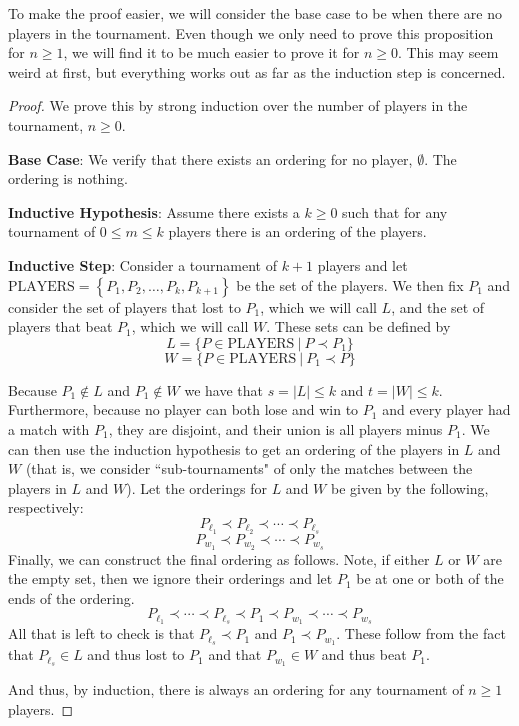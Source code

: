 \documentclass{article}
\theoremstyle{plain}
\theoremstyle{definition}
\begin{document}
To make the proof easier, we will consider the base case to be when there are no players in the tournament. Even though we only need to prove this proposition for \(n \geq 1\), we will find it to be much easier to prove it for \(n \geq 0\). This may seem weird at first, but everything works out as far as the induction step is concerned.

\begin{proof}
    We prove this by strong induction over the number of players in the tournament, \(n \geq 0\).
    
    \textbf{Base Case}: We verify that there exists an ordering for no player, \(\emptyset\). The ordering is nothing.

    \textbf{Inductive Hypothesis}: Assume there exists a \(k \geq 0\) such that for any tournament of \(0 \leq m \leq k\) players there is an ordering of the players.

    \textbf{Inductive Step}: Consider a tournament of \(k+1\) players and let \(\text{PLAYERS} = \left\{P_1, P_2, \dotsc, P_k, P_{k+1}\right\}\) be the set of the players. We then fix \(P_1\) and consider the set of players that lost to \(P_1\), which we will call \(L\), and the set of players that beat \(P_1\), which we will call \(W\). These sets can be defined by 
    \[L = \{P \in \text{PLAYERS}\ |\ P \prec P_1\}\]
    \[W = \{P \in \text{PLAYERS}\ |\ P_1 \prec P\}\]

    Because \(P_1 \notin L\) and \(P_1 \notin W\) we have that \(s = |L| \leq k\) and \(t = |W| \leq k\). Furthermore, because no player can both lose and win to \(P_1\) and every player had a match with \(P_1\), they are disjoint, and their union is all players minus \(P_1\). We can then use the induction hypothesis to get an ordering of the players in \(L\) and \(W\) (that is, we consider ``sub-tournaments" of only the matches between the players in \(L\) and \(W\)). Let the orderings for \(L\) and \(W\) be given by the following, respectively:
    \[P_{\ell_1} \prec P_{\ell_2} \prec \cdots \prec P_{\ell_s}\]
    \[P_{w_1} \prec P_{w_2} \prec \cdots \prec P_{w_s}\]
    Finally, we can construct the final ordering as follows. Note, if either \(L\) or \(W\) are the empty set, then we ignore their orderings and let \(P_1\) be at one or both of the ends of the ordering.
    \[P_{\ell_1} \prec \cdots \prec P_{\ell_s} \prec P_1 \prec P_{w_1} \prec \cdots \prec P_{w_s}\]
    All that is left to check is that \(P_{\ell_s} \prec P_1\) and \(P_1 \prec P_{w_1}\). These follow from the fact that \(P_{\ell_s} \in L\) and thus lost to \(P_1\) and that \(P_{w_1} \in W\) and thus beat \(P_1\).

    And thus, by induction, there is always an ordering for any tournament of \(n \geq 1\) players.
\end{proof}
\end{document}
